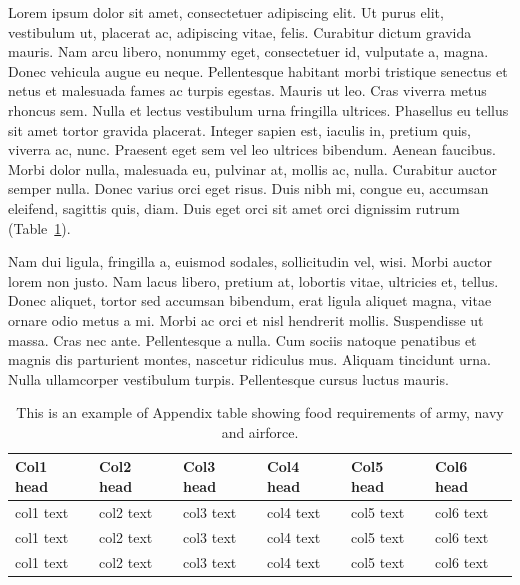 \documentclass[AMA,Times1COL]{WileyNJDv5} %
\begin{document}

Lorem ipsum dolor sit amet, consectetuer adipiscing elit. Ut purus elit, vestibulum ut, placerat ac, adipiscing vitae,
felis. Curabitur dictum gravida mauris. Nam arcu libero, nonummy eget, consectetuer id, vulputate a, magna. Donec
vehicula augue eu neque. Pellentesque habitant morbi tristique senectus et netus et malesuada fames ac turpis egestas.
Mauris ut leo. Cras viverra metus rhoncus sem. Nulla et lectus vestibulum urna fringilla ultrices. Phasellus eu tellus
sit amet tortor gravida placerat. Integer sapien est, iaculis in, pretium quis, viverra ac, nunc. Praesent eget sem vel
leo ultrices bibendum. Aenean faucibus. Morbi dolor nulla, malesuada eu, pulvinar at, mollis ac, nulla. Curabitur
auctor semper nulla. Donec varius orci eget risus. Duis nibh mi, congue eu, accumsan eleifend, sagittis quis, diam.
Duis eget orci sit amet orci dignissim rutrum (Table~\ref{tab4}).

Nam dui ligula, fringilla a, euismod sodales, sollicitudin vel, wisi. Morbi auctor lorem non justo. Nam lacus libero,
pretium at, lobortis vitae, ultricies et, tellus. Donec aliquet, tortor sed accumsan bibendum, erat ligula aliquet magna,
vitae ornare odio metus a mi. Morbi ac orci et nisl hendrerit mollis. Suspendisse ut massa. Cras nec ante. Pellentesque
a nulla. Cum sociis natoque penatibus et magnis dis parturient montes, nascetur ridiculus mus. Aliquam tincidunt
urna. Nulla ullamcorper vestibulum turpis. Pellentesque cursus luctus mauris.

\begin{table}[t]%
\centering
\caption{This is an example of Appendix table showing food requirements of army, navy and airforce.\label{tab4}}%
\begin{tabular*}{\textwidth}{@{\extracolsep\fill}llllll@{\extracolsep\fill}}%
\toprule
\textbf{Col1 head} & \textbf{Col2 head} & \textbf{Col3 head} & \textbf{Col4 head} & \textbf{Col5 head} & \textbf{Col6 head} \\
\midrule
col1 text & col2 text & col3 text & col4 text & col5 text & col6 text\\
col1 text & col2 text & col3 text & col4 text & col5 text & col6 text\\
col1 text & col2 text & col3 text& col4 text & col5 text & col6 text\\
\bottomrule
\end{tabular*}
\end{table}
\end{document}

